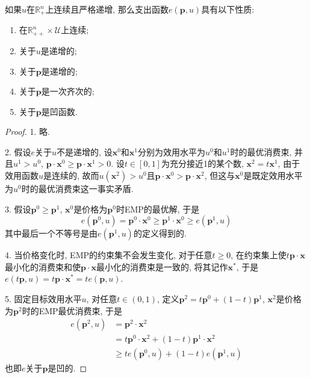 \documentclass[cn, 12pt, math=mtpro2, bibstyle=apa, blue, twocol]{elegantbook}
\newcommand{\R}{\mathbb{R}}
\newcommand{\p}{\mathbf{p}}
\newcommand{\x}{\mathbf{x}}
\begin{document}
\begin{theorem}[支出函数的性质]
  如果$u$在$\R_+^n$上连续且严格递增, 那么支出函数$e(\p,u)$具有以下性质:
  \begin{enumerate}[label=\arabic*.]
    \item 在$\R_{++}^n\times\mathcal{U}$上连续;
    \item 关于$u$是递增的;
    \item 关于$\p$是递增的;
    \item 关于$\p$是一次齐次的;
    \item 关于$\p$是凹函数.
  \end{enumerate}
\end{theorem}
\begin{proof}
  1. 略.

  2. 假设$e$关于$u$不是递增的, 设$\x^0$和$\x^1$分别为效用水平为$u^0$和$u^1$时的最优消费束, 并且$u^1>u^0$, $\p\cdot\x^0\geq \p\cdot\x^1>0$. 设$t\in[0,1]$为充分接近1的某个数, $\x^2=t\x^1$, 由于效用函数$u$是连续的, 故而$u(\x^2)>u^0$且$\p\cdot\x^0>\p\cdot\x^2$, 但这与$\x^0$是既定效用水平为$u^0$时的最优消费束这一事实矛盾.

  3. 假设$\p^0\ge\p^1$, $\x^0$是价格为$\p^0$时EMP的最优解, 于是
  $$e(\p^0,u)=\p^0\cdot\x^0\ge \p^1\cdot\x^0\ge e(\p^1,u)$$
  其中最后一个不等号是由$e(\p^1,u)$的定义得到的.

  4. 当价格变化时, EMP的约束集不会发生变化, 对于任意$t\ge0$, 在约束集上使$t\p\cdot\x$最小化的消费束和使$\p\cdot\x$最小化的消费束是一致的, 将其记作$\x^\ast$, 于是$e(t\p,u)=t\p\cdot\x^\ast=te(\p,u)$.

  5. 固定目标效用水平$u$, 对任意$t\in(0,1)$, 定义$\p^2=t\p^0+(1-t)\p^1$, $\x^2$是价格为$\p^2$时的EMP最优消费束, 于是
  \begin{align*}
  e(\p^2,u)&=\p^2\cdot\x^2 \\
  &=t\p^0\cdot\x^2+(1-t)\p^1\cdot\x^2 \\
  &\geq te(\p^0,u)+(1-t)e(\p^1,u)
  \end{align*}
  也即$e$关于$\p$是凹的.
\end{proof}
\end{document}
